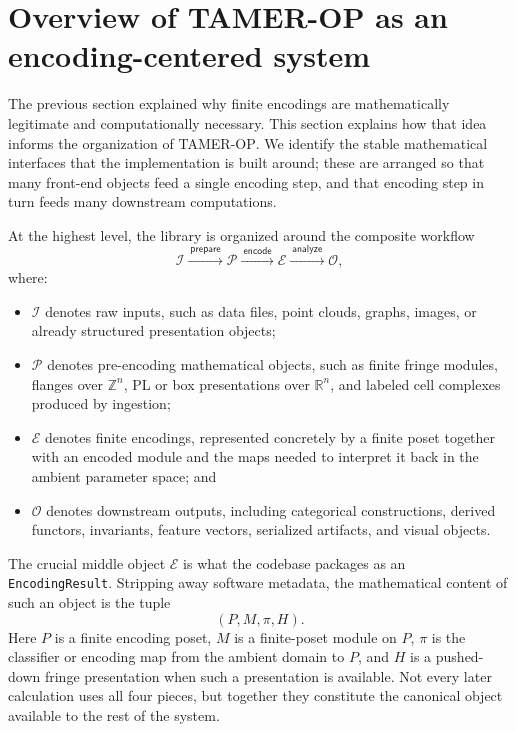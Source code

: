 \documentclass[11pt]{article}
\newcommand{\TAMER}{\textsc{TAMER-OP}}
\theoremstyle{definition}
\theoremstyle{remark}
\begin{document}
\section{Overview of \TAMER{} as an encoding-centered system}\label{sec:system-overview}

The previous section explained why finite encodings are mathematically legitimate and computationally necessary.  This section explains how that idea informs the organization of \TAMER{}.  We identify the stable mathematical interfaces that the implementation is built around; these are arranged so that many front-end objects feed a single encoding step, and that encoding step in turn feeds many downstream computations.

At the highest level, the library is organized around the composite workflow
\[
\mathcal{I}
\xrightarrow{\ \mathsf{prepare}\ }
\mathcal{P}
\xrightarrow{\ \mathsf{encode}\ }
\mathcal{E}
\xrightarrow{\ \mathsf{analyze}\ }
\mathcal{O},
\]
where:
\begin{itemize}[leftmargin=1.5em]
    \item $\mathcal{I}$ denotes raw inputs, such as data files, point clouds, graphs, images, or already structured presentation objects;
    \item $\mathcal{P}$ denotes pre-encoding mathematical objects, such as finite fringe modules, flanges over $\mathbb{Z}^n$, PL or box presentations over $\mathbb{R}^n$, and labeled cell complexes produced by ingestion;
    \item $\mathcal{E}$ denotes finite encodings, represented concretely by a finite poset together with an encoded module and the maps needed to interpret it back in the ambient parameter space; and
    \item $\mathcal{O}$ denotes downstream outputs, including categorical constructions, derived functors, invariants, feature vectors, serialized artifacts, and visual objects.
\end{itemize}

The crucial middle object $\mathcal{E}$ is what the codebase packages as an \texttt{EncodingResult}.  Stripping away software metadata, the mathematical content of such an object is the tuple
\[
(P,M,\pi,H).
\]
Here $P$ is a finite encoding poset, $M$ is a finite-poset module on $P$, $\pi$ is the classifier or encoding map from the ambient domain to $P$, and $H$ is a pushed-down fringe presentation when such a presentation is available.  Not every later calculation uses all four pieces, but together they constitute the canonical object available to the rest of the system.
\end{document}
